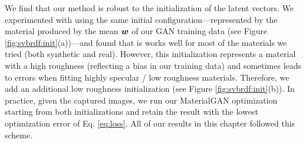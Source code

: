 We find that our method is robust to the initialization of the latent vectors. We experimented with using the same initial configuration---represented by the material produced by the mean $\bm{w}$ of our GAN training data (see Figure \ref{fig:svbrdf:init}(a))---and found that is works well for most of the materials we tried (both synthetic and real).
However, this initialization represents a material with a high roughness (reflecting a bias in our training data) and sometimes leads to errors when fitting highly specular / low roughness materials.
Therefore, we add an additional low roughness initialization (see Figure \ref{fig:svbrdf:init}(b)).
In practice, given the captured images, we run our MaterialGAN optimization starting from both initializations and retain the result with the lowest optimization error of Eq. \eqref{eq:loss}.
All of our results in this chapter followed this scheme.

